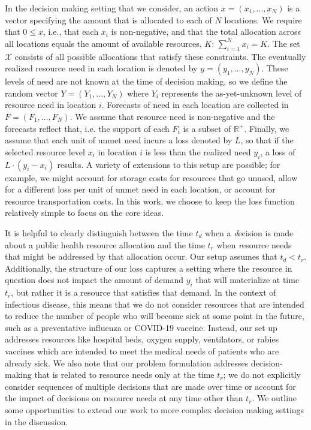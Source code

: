 \documentclass{article}\usepackage[]{graphicx}\usepackage[]{xcolor}
\begin{document}
In the decision making setting that we consider, an action $x = (x_1, \ldots, x_N)$ is a vector specifying the amount that is allocated to each of $N$ locations. We require that $0 \leq x$, i.e., that each $x_i$ is non-negative, and that the total allocation across all locations equals the amount of available resources, $K$: $\sum_{i=1}^N x_i = K$. The set $\mathcal{X}$ consists of all possible allocations that satisfy these constraints. The eventually realized resource need in each location is denoted by $y = (y_1, \ldots, y_N)$. These levels of need are not known at the time of decision making, so we define the random vector $Y = (Y_1, \ldots, Y_N)$ where $Y_i$ represents the as-yet-unknown level of resource need in location $i$. Forecasts of need in each location are collected in $F = (F_1, \ldots, F_N)$. We assume that resource need is non-negative and the forecasts reflect that, i.e. the support of each $F_i$ is a subset of $\mathbb{R}^+$. Finally, we assume that each unit of unmet need incurs a loss denoted by $L$, so that if the selected resource level $x_i$ in location $i$ is less than the realized need $y_i$, a loss of $L \cdot (y_i - x_i)$ results. A variety of extensions to this setup are possible; for example, we might account for storage costs for resources that go unused, allow for a different loss per unit of unmet need in each location, or account for resource transportation costs. In this work, we choose to keep the loss function relatively simple to focus on the core ideas.

It is helpful to clearly distinguish between the time $t_d$ when a \emph{d}ecision is made about a public health resource allocation and the time $t_r$ when \emph{r}esource needs that might be addressed by that allocation occur. Our setup assumes that $t_d < t_r$. Additionally, the structure of our loss captures a setting where the resource in question does not impact the amount of demand $y_i$ that will materialize at time $t_r$, but rather it is a resource that satisfies that demand. In the context of infectious disease, this means that we do not consider resources that are intended to reduce the number of people who will become sick at some point in the future, such as a preventative influenza or COVID-19 vaccine. Instead, our set up addresses resources like hospital beds, oxygen supply, ventilators, or rabies vaccines which are intended to meet the medical needs of patients who are already sick. We also note that our problem formulation addresses decision-making that is related to resource needs only at the time $t_r$; we do not explicitly consider sequences of multiple decisions that are made over time or account for the impact of decisions on resource needs at any time other than $t_r$. We outline some opportunities to extend our work to more complex decision making settings in the discussion.
\end{document}
